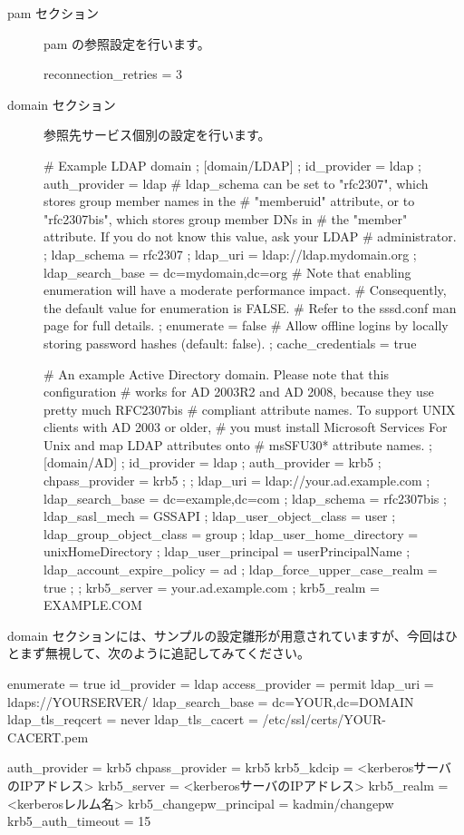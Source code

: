 \documentclass[mingoth,a4paper]{jsarticle}
\begin{document}
\begin{description}
\item [pam セクション] pam の参照設定を行います。
\begin{commandline}
reconnection_retries = 3
\end{commandline}

\item [domain セクション] 参照先サービス個別の設定を行います。
\begin{commandline}
# Example LDAP domain
; [domain/LDAP]
; id_provider = ldap
; auth_provider = ldap
# ldap_schema can be set to "rfc2307", which stores group member names in the
# "memberuid" attribute, or to "rfc2307bis", which stores group member DNs in
# the "member" attribute. If you do not know this value, ask your LDAP
# administrator.
; ldap_schema = rfc2307
; ldap_uri = ldap://ldap.mydomain.org
; ldap_search_base = dc=mydomain,dc=org
# Note that enabling enumeration will have a moderate performance impact.
# Consequently, the default value for enumeration is FALSE.
# Refer to the sssd.conf man page for full details.
; enumerate = false
# Allow offline logins by locally storing password hashes (default: false).
; cache_credentials = true

# An example Active Directory domain. Please note that this configuration
# works for AD 2003R2 and AD 2008, because they use pretty much RFC2307bis
# compliant attribute names. To support UNIX clients with AD 2003 or older,
# you must install Microsoft Services For Unix and map LDAP attributes onto
# msSFU30* attribute names.
; [domain/AD]
; id_provider = ldap
; auth_provider = krb5
; chpass_provider = krb5
;
; ldap_uri = ldap://your.ad.example.com
; ldap_search_base = dc=example,dc=com
; ldap_schema = rfc2307bis
; ldap_sasl_mech = GSSAPI
; ldap_user_object_class = user
; ldap_group_object_class = group
; ldap_user_home_directory = unixHomeDirectory
; ldap_user_principal = userPrincipalName
; ldap_account_expire_policy = ad
; ldap_force_upper_case_realm = true
;
; krb5_server = your.ad.example.com
; krb5_realm = EXAMPLE.COM
\end{commandline}
\end{description}

domain セクションには、サンプルの設定雛形が用意されていますが、今回はひとまず無視して、次のように追記してみてください。

\begin{commandline}
enumerate = true
id_provider = ldap
access_provider = permit
ldap_uri = ldaps://YOURSERVER/
ldap_search_base = dc=YOUR,dc=DOMAIN
ldap_tls_reqcert = never
ldap_tls_cacert = /etc/ssl/certs/YOUR-CACERT.pem

auth_provider = krb5
chpass_provider = krb5
krb5_kdcip = <kerberosサーバのIPアドレス>
krb5_server = <kerberosサーバのIPアドレス>
krb5_realm = <kerberosレルム名>
krb5_changepw_principal = kadmin/changepw
krb5_auth_timeout = 15
\end{commandline}
\end{document}
